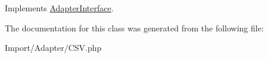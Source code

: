 Implements \hyperlink{interface_anemo_1_1_import_1_1_adapter_1_1_adapter_interface_a75416ddc6d147a0aaca83783f838403a}{AdapterInterface}.



The documentation for this class was generated from the following file:\begin{DoxyCompactItemize}
\item 
Import/Adapter/CSV.php\end{DoxyCompactItemize}
